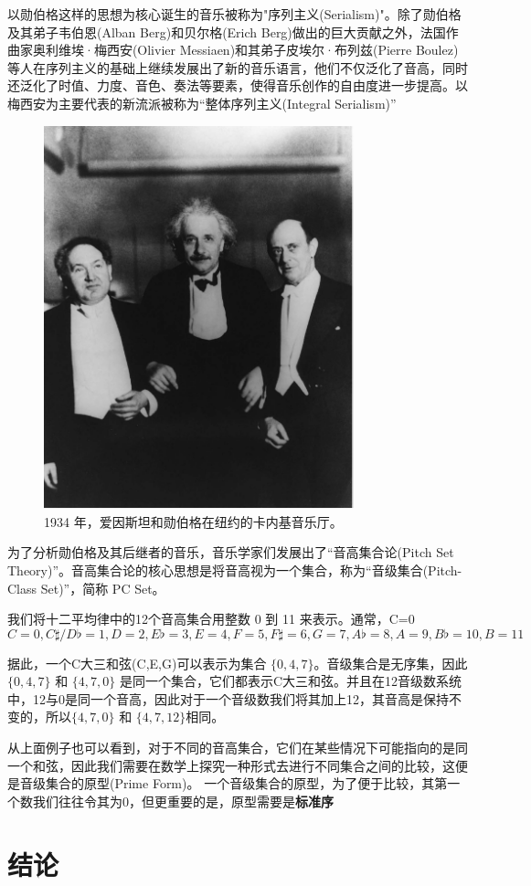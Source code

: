 \documentclass{article}
\begin{document}
以勋伯格这样的思想为核心诞生的音乐被称为"序列主义(Serialism)"。除了勋伯格及其弟子韦伯恩(Alban Berg)和贝尔格(Erich Berg)做出的巨大贡献之外，法国作曲家奥利维埃·梅西安(Olivier Messiaen)和其弟子皮埃尔·布列兹(Pierre Boulez)等人在序列主义的基础上继续发展出了新的音乐语言，他们不仅泛化了音高，同时还泛化了时值、力度、音色、奏法等要素，使得音乐创作的自由度进一步提高。以梅西安为主要代表的新流派被称为“整体序列主义(Integral Serialism)”

\begin{figure}[h!]
    \centering
    \includegraphics[width=0.8\textwidth]{image/im1.png}
    \caption{1934 年，爱因斯坦和勋伯格在纽约的卡内基音乐厅。}
    \label{fig:einstein_schoenberg}
\end{figure}

为了分析勋伯格及其后继者的音乐，音乐学家们发展出了“音高集合论(Pitch Set Theory)”。音高集合论的核心思想是将音高视为一个集合，称为“音级集合(Pitch-Class Set)”，简称 PC Set\cite{forte_structure_2007}。

我们将十二平均律中的12个音高集合用整数 0 到 11 来表示。通常，C=0
\[
    C=0, C\sharp/D\flat=1, D=2, E\flat=3, E=4, F=5, F\sharp=6, G=7, A\flat=8, A=9, B\flat=10, B=11
\]

据此，一个C大三和弦(C,E,G)可以表示为集合 $\{0, 4, 7\}$。音级集合是无序集，因此 $\{0, 4, 7\}$ 和 $\{4, 7, 0\}$ 是同一个集合，它们都表示C大三和弦。并且在12音级数系统中，12与0是同一个音高，因此对于一个音级数我们将其加上12，其音高是保持不变的，所以$\{4, 7, 0\}$ 和 $\{4, 7, 12\}$相同。

从上面例子也可以看到，对于不同的音高集合，它们在某些情况下可能指向的是同一个和弦，因此我们需要在数学上探究一种形式去进行不同集合之间的比较，这便是音级集合的原型(Prime Form)。 一个音级集合的原型，为了便于比较，其第一个数我们往往令其为0，但更重要的是，原型需要是\textbf{标准序}

\section{结论}



\end{document}
